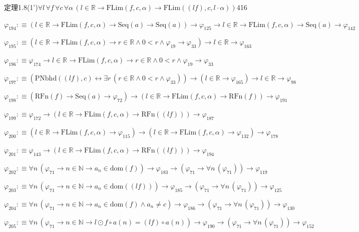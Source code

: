\begin{fullproof}{定理1.8(1')}{$\forall l\,\forall f\,\forall c\,\forall \alpha\,(l \in \mathbb{R} \to \mathrm{FLim}(f,c,\alpha) \to \mathrm{FLim}((l f),c,l \cdot \alpha))$}{416}
\begin{abbrevlist}
\item $\varphi_{194} :\equiv (l \in \mathbb{R} \to \mathrm{FLim}(f,c,\alpha) \to \mathrm{Seq}(a) \to \mathrm{Seq}(a)) \to \varphi_{125} \to l \in \mathbb{R} \to \mathrm{FLim}(f,c,\alpha) \to \mathrm{Seq}(a) \to \varphi_{142}$
\item $\varphi_{195} :\equiv (l \in \mathbb{R} \to \mathrm{FLim}(f,c,\alpha) \to r \in \mathbb{R} \land 0 < r \land \varphi_{19} \to \varphi_{33}) \to l \in \mathbb{R} \to \varphi_{163}$
\item $\varphi_{196} :\equiv \varphi_{174} \to l \in \mathbb{R} \to \mathrm{FLim}(f,c,\alpha) \to r \in \mathbb{R} \land 0 < r \land \varphi_{19} \to \varphi_{33}$
\item $\varphi_{197} :\equiv (\mathrm{PNbhd}((l f),c) \leftrightarrow \exists r\,(r \in \mathbb{R} \land 0 < r \land \varphi_{33})) \to (l \in \mathbb{R} \to \varphi_{165}) \to l \in \mathbb{R} \to \varphi_{98}$
\item $\varphi_{198} :\equiv (\mathrm{RFn}(f) \to \mathrm{Seq}(a) \to \varphi_{72}) \to (l \in \mathbb{R} \to \mathrm{FLim}(f,c,\alpha) \to \mathrm{RFn}(f)) \to \varphi_{191}$
\item $\varphi_{199} :\equiv \varphi_{172} \to (l \in \mathbb{R} \to \mathrm{FLim}(f,c,\alpha) \to \mathrm{RFn}((l f))) \to \varphi_{187}$
\item $\varphi_{200} :\equiv (l \in \mathbb{R} \to \mathrm{FLim}(f,c,\alpha) \to \varphi_{115}) \to (l \in \mathbb{R} \to \mathrm{FLim}(f,c,\alpha) \to \varphi_{132}) \to \varphi_{178}$
\item $\varphi_{201} :\equiv \varphi_{143} \to (l \in \mathbb{R} \to \mathrm{FLim}(f,c,\alpha) \to \mathrm{RFn}((l f))) \to \varphi_{194}$
\item $\varphi_{202} :\equiv \forall n\,(\varphi_{71} \to n \in \mathbb{N} \to a_{n} \in \mathrm{dom}(f)) \to \varphi_{183} \to (\varphi_{71} \to \forall n\,(\varphi_{71})) \to \varphi_{119}$
\item $\varphi_{203} :\equiv \forall n\,(\varphi_{71} \to n \in \mathbb{N} \to a_{n} \in \mathrm{dom}((l f))) \to \varphi_{185} \to (\varphi_{71} \to \forall n\,(\varphi_{71})) \to \varphi_{125}$
\item $\varphi_{204} :\equiv \forall n\,(\varphi_{71} \to n \in \mathbb{N} \to a_{n} \in \mathrm{dom}(f) \land a_{n} \neq c) \to \varphi_{186} \to (\varphi_{71} \to \forall n\,(\varphi_{71})) \to \varphi_{130}$
\item $\varphi_{205} :\equiv \forall n\,(\varphi_{71} \to n \in \mathbb{N} \to l \odot f \circ a(n) = (l f) \circ a(n)) \to \varphi_{190} \to (\varphi_{71} \to \forall n\,(\varphi_{71})) \to \varphi_{152}$
\end{abbrevlist}
\end{fullproof}
